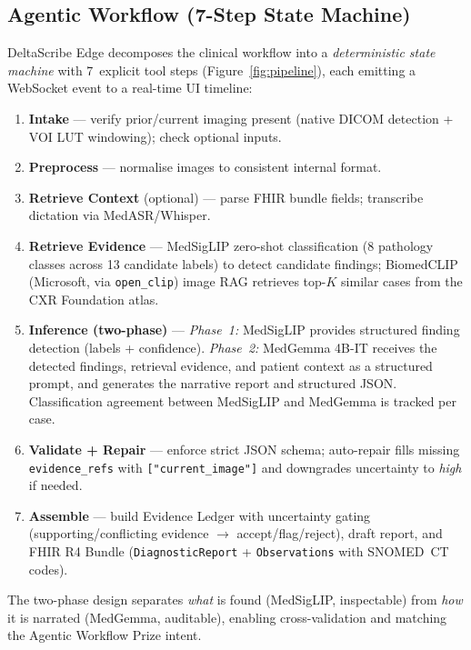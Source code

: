 \documentclass[10pt,twocolumn]{article}
\begin{document}
\subsection{Agentic Workflow (7-Step State Machine)}

DeltaScribe Edge decomposes the clinical workflow into a \emph{deterministic state machine} with 7~explicit tool steps (Figure~\ref{fig:pipeline}), each emitting a WebSocket event to a real-time UI timeline:

\begin{enumerate}
  \item \textbf{Intake} --- verify prior/current imaging present (native DICOM detection + VOI LUT windowing); check optional inputs.
  \item \textbf{Preprocess} --- normalise images to consistent internal format.
  \item \textbf{Retrieve Context} (optional) --- parse FHIR bundle fields; transcribe dictation via MedASR/Whisper.
  \item \textbf{Retrieve Evidence} --- MedSigLIP zero-shot classification (8 pathology classes across 13 candidate labels) to detect candidate findings; BiomedCLIP (Microsoft, via \texttt{open\_clip}) image RAG retrieves top-$K$ similar cases from the CXR Foundation atlas.
  \item \textbf{Inference (two-phase)} ---
    \emph{Phase~1:} MedSigLIP provides structured finding detection (labels + confidence).
    \emph{Phase~2:} MedGemma 4B-IT receives the detected findings, retrieval evidence, and patient context as a structured prompt, and generates the narrative report and structured JSON.
    Classification agreement between MedSigLIP and MedGemma is tracked per case.
  \item \textbf{Validate + Repair} --- enforce strict JSON schema; auto-repair fills missing \texttt{evidence\_refs} with \texttt{["current\_image"]} and downgrades uncertainty to \textit{high} if needed.
  \item \textbf{Assemble} --- build Evidence Ledger with uncertainty gating (supporting/conflicting evidence $\rightarrow$ accept/flag/reject), draft report, and FHIR R4 Bundle (\texttt{DiagnosticReport} + \texttt{Observations} with SNOMED~CT codes).
\end{enumerate}

The two-phase design separates \emph{what} is found (MedSigLIP, inspectable) from \emph{how} it is narrated (MedGemma, auditable), enabling cross-validation and matching the Agentic Workflow Prize intent.
\end{document}
